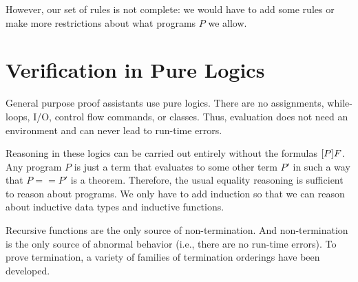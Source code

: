 However, our set of rules is not complete: we would have to add some rules or make more restrictions about what programs $P$ we allow.

\section{Verification in Pure Logics}

General purpose proof assistants use pure logics.
There are no assignments, while-loops, I/O, control flow commands, or classes.
Thus, evaluation does not need an environment and can never lead to run-time errors.

Reasoning in these logics can be carried out entirely without the formulas $[P]F$.
Any program $P$ is just a term that evaluates to some other term $P'$ in such a way that $P==P'$ is a theorem.
Therefore, the usual equality reasoning is sufficient to reason about programs.
We only have to add induction so that we can reason about inductive data types and inductive functions.

Recursive functions are the only source of non-termination.
And non-termination is the only source of abnormal behavior (i.e., there are no run-time errors).
To prove termination, a variety of families of termination orderings have been developed.

